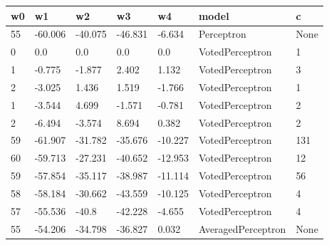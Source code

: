 \begin{tabular}{lllllll}
\toprule
w0 & w1 & w2 & w3 & w4 & model & c \\
\midrule
55 & -60.006 & -40.075 & -46.831 & -6.634 & Perceptron & None \\
0 & 0.0 & 0.0 & 0.0 & 0.0 & VotedPerceptron & 1 \\
1 & -0.775 & -1.877 & 2.402 & 1.132 & VotedPerceptron & 3 \\
2 & -3.025 & 1.436 & 1.519 & -1.766 & VotedPerceptron & 1 \\
1 & -3.544 & 4.699 & -1.571 & -0.781 & VotedPerceptron & 2 \\
2 & -6.494 & -3.574 & 8.694 & 0.382 & VotedPerceptron & 2 \\
59 & -61.907 & -31.782 & -35.676 & -10.227 & VotedPerceptron & 131 \\
60 & -59.713 & -27.231 & -40.652 & -12.953 & VotedPerceptron & 12 \\
59 & -57.854 & -35.117 & -38.987 & -11.114 & VotedPerceptron & 56 \\
58 & -58.184 & -30.662 & -43.559 & -10.125 & VotedPerceptron & 4 \\
57 & -55.536 & -40.8 & -42.228 & -4.655 & VotedPerceptron & 4 \\
55 & -54.206 & -34.798 & -36.827 & 0.032 & AveragedPerceptron & None \\
\bottomrule
\end{tabular}
